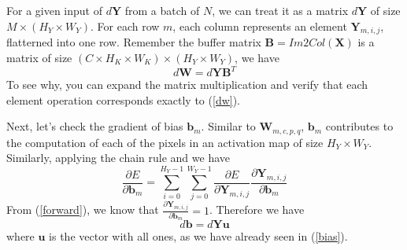 \documentclass[authordraft=true,dvipsnames]{acmart}
\newcommand{\pref}[1]{(\ref{#1})}
\newcommand{\bx}[0]{\mathbf{X}}
\newcommand{\bw}[0]{\mathbf{W}}
\newcommand{\by}[0]{\mathbf{Y}}
\newcommand{\bb}[0]{\mathbf{B}}
\begin{document}
For a given input of $d\by$ from a batch of $N$, we can treat it as a matrix $d\mathbf{Y}$ of size $M \times (H_Y \times W_Y)$. For each row $m$, each column represents an element $\mathbf{Y}_{m,i,j}$, flatterned into one row. Remember the buffer matrix $\bb=Im2Col(\bx)$ is a matrix of size $(C \times H_K \times W_K) \times (H_Y \times W_Y)$, we have 
\begin{equation}
d\bw = d\by \bb^T
\end{equation}
To see why, you can expand the matrix multiplication and verify that each element operation corresponds exactly to \pref{dw}.

Next, let's check the gradient of bias $\mathbf{b}_m$. Similar to $\bw_{m,c,p,q}$, $\mathbf{b}_m$ contributes to the computation of each of the pixels in an activation map of size  $H_Y \times W_Y$. Similarly, applying the chain rule and we have
\begin{equation}
\frac{\partial E}{\partial \mathbf{b}_m} =  \sum_{i=0}^{H_Y-1}{\sum_{j=0}^{W_Y-1}{\frac{\partial E}{\partial \by_{m,i,j}}\frac{\partial \mathbf{Y}_{m,i,j}}{\partial \mathbf{b}_m}}}
\end{equation}
From \pref{forward}, we know that $\frac{\partial \by_{m,i,j}}{\partial \mathbf{b}_m} = 1$. Therefore we have 
\begin{equation}
d\mathbf{b} = d\by \mathbf{u}
\end{equation}
where $\mathbf{u}$ is the vector with all ones, as we have already seen in \pref{bias}.
\end{document}
